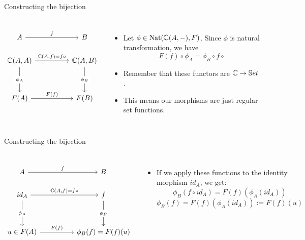 \begin{frame}[fragile]{Constructing the bijection}
	\begin{columns}
		\[\begin{tikzcd}
			A && B \\
			{\bC(A,A)} && {\bC(A,B)} \\
			\\
			{F(A)} && {F(B)}
			\arrow["f", from=1-1, to=1-3]
			\arrow["{\bC(A,f) = f \circ}", from=2-1, to=2-3]
			\arrow["{\phi_A}"{description}, from=2-1, to=4-1]
			\arrow["{\phi_B}"{description}, from=2-3, to=4-3]
			\arrow["{F(f)}", from=4-1, to=4-3]
		\end{tikzcd}\]
		
		\begin{itemize}
			\item Let $\phi \in \text{Nat}(\mathbb{C}(A,-), F)$. Since $\phi$ is natural transformation, we have
			\[F(f) \circ \phi_A = \phi_B \circ f \circ\]
			\pause\item Remember that these functors are $\mathbb{C} \to \mathbb{S} et$.
			\pause\item This means our morphisms are just regular set functions.
		\end{itemize}
	\end{columns}
\end{frame}

\begin{frame}[fragile]{Constructing the bijection}
	\begin{columns}
		\column{0.4\textwidth}
		\[\begin{tikzcd}
			A && B \\
			{id_A} && {f} \\
			\\
			{u \in F(A)} && {\phi_B(f) = F(f)(u)}
			\arrow["f", from=1-1, to=1-3]
			\arrow["{\bC(A,f) = f \circ}", from=2-1, to=2-3]
			\arrow["{\phi_A}"{description}, from=2-1, to=4-1]
			\arrow["{\phi_B}"{description}, from=2-3, to=4-3]
			\arrow["{F(f)}", from=4-1, to=4-3]
		\end{tikzcd}\]
		
		\column{0.6\textwidth}
		\begin{itemize}
			\item If we apply these functions to the identity morphism $id_A$, we get:
			\[\phi_B(f \circ id_A) = F(f)(\phi_A(id_A))\]
			\[\phi_B(f) = F(f)(\phi_A(id_A)) := F(f)(u)\]
		\end{itemize}
	\end{columns}
\end{frame}
